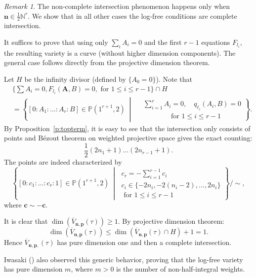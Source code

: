 \documentclass[11pt]{amsart}
\theoremstyle{remark}
\newtheorem{remark}[theorem]{Remark}
\numberwithin{equation}{section}
\begin{document}
\begin{remark} \label{r:CI}
The non-complete intersection phenomenon happens only when $\mathbf{n} \in \tfrac{1}{2}\mathbb{N}^r$.  We show that in all other cases the log-free conditions are complete intersection. 

It suffices to prove that using only $\sum_i A_i=0$ and the first $r-1$ equations $F_{l_i}$, the resulting variety is a curve (without higher dimension components). The general case follows directly from the projective dimension theorem. 

Let $H$ be the infinity divisor (defined by $\{A_0=0\}$). Note that 
\[
\begin{aligned}
    &\Big\{ \sum A_i=0, F_{l_i}(\mathbf{A},B) =0, \text{ for } 1 \leq i \leq r-1 \Big\} \cap H 
    \\
    &= \left\{ [0:A_1:\dots:A_r:B] \in \mathbb{P}(1^{r+1},2) \;\middle|\; 
    \begin{aligned}
        &\sum_{i=1}^r A_i = 0, \quad
        q_{\ell_i}(A_i, B) = 0 \\
        &\qquad \qquad \text{for } 1 \le i \le r-1
    \end{aligned}
    \right\}.
\end{aligned}
\]
By Proposition~\ref{p:topterm}, it is easy to see that the intersection only consists of points and B\'ezout theorem on weighted projective space gives the exact counting:
\[
    \frac{1}{2} (2n_1+1) \dots (2n_{r-1}+1).  
\]
The points are indeed characterized by
\[
    \left\{ [0:c_1:\dots:c_r:1] \in\mathbb{P}(1^{r+1},2)\:\middle|\; \substack{\displaystyle c_r = -\sum_{i=1}^{r-1} c_i \\  \displaystyle c_i \in \{ -2n_i, -2(n_i-2), \dots, 2n_i \}  \\ \displaystyle \text{ for }1\leq i \leq r-1 } \right\} \Big/ \sim, 
\]
where $\mathbf{c} \sim - \mathbf{c}$. 

It is clear that $\dim (\overline{V}_{\mathbf{n},\mathbf{p}}(\tau)) \ge 1$. By projective dimension theorem:
\[  
    \dim (\overline{V}_{\mathbf{n},\mathbf{p}}(\tau)) \leq \dim (\overline{V}_{\mathbf{n},\mathbf{p}}(\tau) \cap H) +1 =1. 
\]
Hence $\overline{V}_{\mathbf{n},\mathbf{p},}(\tau)$ has pure dimension one and then a complete intersection.

 Iwasaki (\cite[Theorem 2.5]{Iwasaki_1991}) also observed this generic behavior, proving that the log-free variety has pure dimension $m$, where $m>0$ is the number of non-half-integral weights. 
\end{remark}
\end{document}
